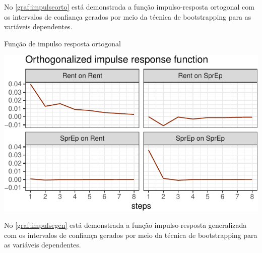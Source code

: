 \documentclass[
  12pt,
  12pt,
  openright,
  oneside,
  a4paper,
  chapter=TITLE,
  section=TITLE,
  subsection=TITLE,
  subsubsection=TITLE,
  english,
  portugues,
  sumario=tradicional]{abntex2}
\begin{document}
No \autoref{graf:impulseorto} está demonstrada a função impulso-resposta ortogonal com os intervalos de confiança gerados por meio da técnica de bootstrapping para as variáveis dependentes.

\vspace{20pt}

\begin{grafico}[!htbp]
\caption{Função de impulso resposta ortogonal}
\vspace{-4mm}

\begin{center}\includegraphics{12-exportedfigures/impulse.plot.orto-1} \end{center}
\vspace{-3mm}
\label{graf:impulseorto}
\vspace{-2mm}
\end{grafico}

No \autoref{graf:impulsegen} está demonstrada a função impulso-resposta generalizada com os intervalos de confiança gerados por meio da técnica de bootstrapping para as variáveis dependentes.
\end{document}
